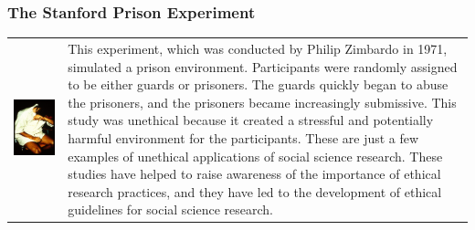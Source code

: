 \documentclass[
  b5paper]{book}
\begin{document}
\hypertarget{the-stanford-prison-experiment}{%
\subsubsection*{The Stanford Prison Experiment}\label{the-stanford-prison-experiment}}

\begin{longtable}[]{@{}
  >{\raggedright\arraybackslash}p{}
  >{\raggedright\arraybackslash}p{}@{}}
\toprule\noalign{}
\endhead
\bottomrule\noalign{}
\endlastfoot
\includegraphics[width=1\textwidth,height=\textheight]{images/prisoner-breaks-down.png} & This experiment, which was conducted by Philip Zimbardo in 1971, simulated a prison environment. Participants were randomly assigned to be either guards or prisoners. The guards quickly began to abuse the prisoners, and the prisoners became increasingly submissive. This study was unethical because it created a stressful and potentially harmful environment for the participants. These are just a few examples of unethical applications of social science research. These studies have helped to raise awareness of the importance of ethical research practices, and they have led to the development of ethical guidelines for social science research. \\
\end{longtable}
\end{document}
